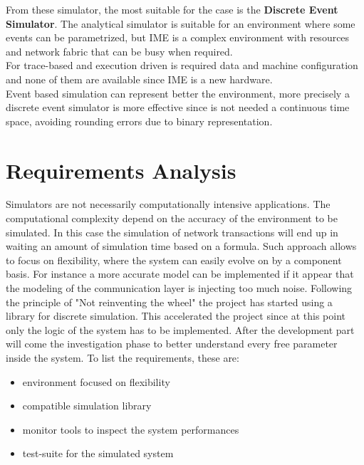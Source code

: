 From these simulator, the most suitable for the case is the \textbf{Discrete
Event Simulator}. The analytical simulator is suitable for an environment where
some events can be parametrized, but IME is a complex environment with resources
and network fabric that can be busy when required. \\
For trace-based and execution driven is required data and machine configuration
and none of them are available since IME is a new hardware. \\
Event based simulation can represent better the environment, more precisely a
discrete event simulator is more effective since is not needed a continuous time
space, avoiding rounding errors due to binary representation.


\section{Requirements Analysis}\label{requirements}
Simulators are not necessarily computationally intensive applications. The
computational complexity depend on the accuracy of the environment to be
simulated. In this case the simulation of network transactions will end up in
waiting an amount of simulation time based on a formula. 
Such approach allows to focus on flexibility, where the system can easily evolve
on by a component basis. For instance a more accurate model can be implemented
if it appear that the modeling of the communication layer is injecting too much
noise.
Following the principle of "Not reinventing the wheel" the project has started
using a library for discrete simulation. This
accelerated the project since at this point only the logic of the system has to
be implemented. After the development part will come the investigation phase to
better understand every free parameter inside the system.
To list the requirements, these are:
\begin{itemize}
    \item environment focused on flexibility
    \item compatible simulation library
    \item monitor tools to inspect the system performances
    \item test-suite for the simulated system 
\end{itemize}

